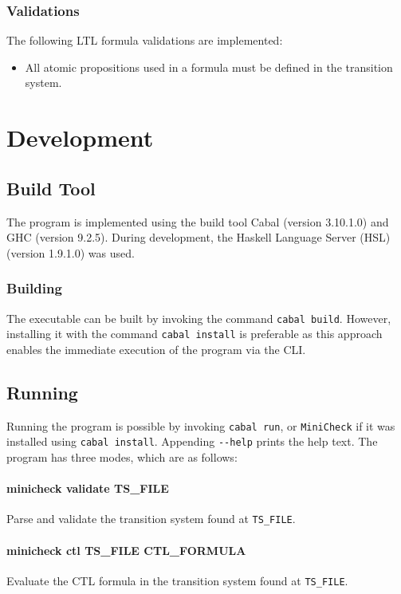 \documentclass[11pt]{article}
\begin{document}
\subsubsection{Validations}

The following LTL formula validations are implemented:

\begin{itemize}
  \item All atomic propositions used in a formula must be defined in the transition system.
\end{itemize}

\section{Development}
\label{sec:dev}

\subsection{Build Tool}

The program is implemented using the build tool Cabal (version 3.10.1.0) and GHC (version 9.2.5).
During development, the Haskell Language Server (HSL) (version 1.9.1.0) was used.

\subsubsection{Building}
The executable can be built by invoking the command \verb|cabal build|.
However, installing it with the command \verb|cabal install| is preferable as this approach enables the immediate execution of the program via the CLI.

\subsection{Running}
\label{subsec:dev:running}

Running the program is possible by invoking \verb|cabal run|, or \verb|MiniCheck| if it was installed using \verb|cabal install|.
Appending \verb|--help| prints the help text.
The program has three modes, which are as follows:

\paragraph{minicheck validate TS\_FILE}
Parse and validate the transition system found at \verb|TS_FILE|.

\paragraph{minicheck ctl TS\_FILE CTL\_FORMULA}
Evaluate the CTL formula in the transition system found at \verb|TS_FILE|.
\end{document}
